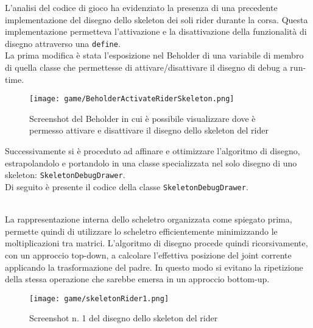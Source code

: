 	L'analisi del codice di gioco ha evidenziato la presenza di una precedente implementazione del disegno dello skeleton dei soli rider durante la corsa. Questa implementazione permetteva l'attivazione e la disattivazione della funzionalità di disegno attraverso una \texttt{define}.\\

	La prima modifica è stata l'esposizione nel Beholder di una variabile di membro di quella classe che permettesse di attivare/disattivare il disegno di debug a run-time.\\
	
	\begin{figure}[h!] 
		\centering 
		\hspace*{-0.05\columnwidth}\texttt{[image: game/BeholderActivateRiderSkeleton.png]} 
		\caption{Screenshot del Beholder in cui è possibile visualizzare dove è permesso attivare e disattivare il disegno dello skeleton del rider}
	\end{figure}
	
	Successivamente si è proceduto ad affinare e ottimizzare l'algoritmo di disegno, estrapolandolo e portandolo in una classe specializzata nel solo disegno di uno skeleton: \texttt{SkeletonDebugDrawer}.\\
	
	Di seguito è presente il codice della classe \texttt{SkeletonDebugDrawer}.
	
	
	
	
	~\\
	La rappresentazione interna dello scheletro organizzata come spiegato prima, permette quindi di utilizzare lo scheletro efficientemente minimizzando le moltiplicazioni tra matrici. L'algoritmo di disegno procede quindi ricorsivamente, con un approccio top-down, a calcolare l'effettiva posizione del joint corrente applicando la trasformazione del padre. In questo modo si evitano la ripetizione della stessa operazione che sarebbe emersa in un approccio bottom-up.\\
	
	\begin{figure}[h!] 
		\centering 
		\hspace*{-0.05\columnwidth}\texttt{[image: game/skeletonRider1.png]} 
		\caption{Screenshot n. 1 del disegno dello skeleton del rider}
	\end{figure}
	
